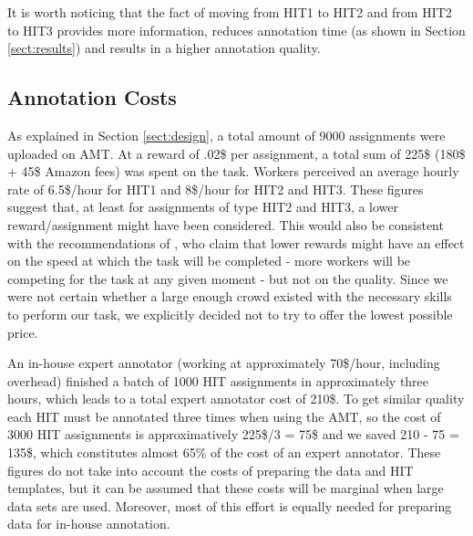 \documentclass[11pt, a4paper,onecolumn]{article}
\begin{document}
It is worth noticing that the fact of moving from HIT1 to HIT2 and from HIT2 to HIT3 provides more information, reduces annotation time (as shown in Section \ref{sect:results}) and results in a higher annotation quality.


\subsection{Annotation Costs}
\label{sect:costs}

As explained in Section \ref{sect:design}, a total amount of 9000 assignments were uploaded on AMT. At a reward of .02\$ per assignment, a total sum of 225\$ (180\$ + 45\$ Amazon fees) was spent on the task. Workers perceived an average hourly rate of 6.5\$/hour for HIT1 and 8\$/hour for HIT2 and HIT3. These figures suggest that, at least for assignments of type HIT2 and HIT3, a lower reward/assignment might have been considered. This would also be consistent with the recommendations of \cite{mason_financial_2009}, who claim that lower rewards might have an effect on the speed at which the task will be completed - more workers will be competing for the task at any given moment - but not on the quality. Since we were not certain whether a large enough crowd existed with the necessary skills to perform our task, we explicitly decided not to try to offer the lowest possible price.



An in-house expert annotator (working at approximately 70\$/hour, including overhead) finished a batch of 1000 HIT assignments in approximately three hours, which leads to a total expert annotator cost of 210\$. To get similar quality each HIT must be annotated three times when using the AMT, so the cost of 3000 HIT assignments is approximatively 225\$/3 = 75\$ and we saved 210 - 75 = 135\$, which constitutes almost 65\% of the cost of an expert annotator. These figures do not take into account the costs of preparing the data and HIT templates, but it can be assumed that these costs will be marginal when large data sets are used. Moreover, most of this effort is equally needed for preparing data for in-house annotation.
\end{document}
